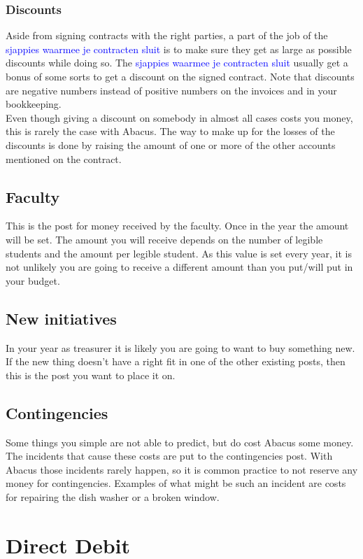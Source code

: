 \documentclass{report}
\begin{document}
\subsubsection{Discounts}
Aside from signing contracts with the right parties, a part of the job of the \textcolor{blue}{sjappies waarmee je contracten sluit} is to make sure they get as large as possible discounts while doing so. The \textcolor{blue}{sjappies waarmee je contracten sluit} usually get a bonus of some sorts to get a discount on the signed contract. Note that discounts are negative numbers instead of positive numbers on the invoices and in your bookkeeping.
\\
Even though giving a discount on somebody in almost all cases costs you money, this is rarely the case with Abacus. The way to make up for the losses of the discounts is done by raising the amount of one or more of the other accounts mentioned on the contract. 

\subsection{Faculty}
This is the post for money received by the faculty. Once in the year the amount will be set. The amount you will receive depends on the number of legible students and the amount per legible student. As this value is set every year, it is not unlikely you are going to receive a different amount than you put/will put in your budget.
\subsection{New initiatives}
In your year as treasurer it is likely you are going to want to buy something new. If the new thing doesn't have a right fit in one of the other existing posts, then this is the post you want to place it on.
\subsection{Contingencies}
Some things you simple are not able to predict, but do cost Abacus some money. The incidents that cause these costs are put to the contingencies post. With Abacus those incidents rarely happen, so it is common practice to not reserve any money for contingencies. Examples of what might be such an incident are costs for repairing the dish washer or a broken window.
\section{Direct Debit}
\end{document}
